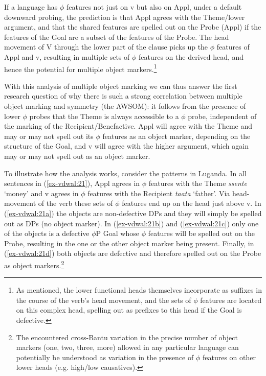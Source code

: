 \documentclass[output=paper
,modfonts
,nonflat]{langsci/langscibook}
\begin{document}
\noindent If a language has $\phi$ features not just on v but also on Appl, under a default downward probing, the prediction is that Appl agrees with the Theme/lower argument, and that the shared features are spelled out on the Probe (Appl) if the features of the Goal are a subset of the features of the Probe. The head movement of V through the lower part of the clause picks up the $\phi$ features of Appl and v, resulting in multiple sets of $\phi$ features on the derived head, and hence the potential for multiple object markers.\footnote{As mentioned, the lower functional heads themselves incorporate as suffixes in the course of the verb’s head movement, and the sets of $\phi$ features are located on this complex head, spelling out as prefixes to this head if the Goal is defective.}\largerpage[2]

With this analysis of multiple object marking we can thus answer the first research question of why there is such a strong correlation between multiple object marking and symmetry (the AWSOM): it follows from the presence of lower $\phi$ probes that the Theme is always accessible to a $\phi$ probe, independent of the marking of the Recipient/Benefactive. Appl will agree with the Theme and may or may not spell out its $\phi$ features as an object marker, depending on the structure of the Goal, and v will agree with the higher argument, which again may or may not spell out as an object marker. 

To illustrate how the analysis works, consider the patterns in Luganda. In all sentences in (\ref{ex-vdwal:21}), Appl agrees in $\phi $ features with the Theme \textit{ssente} ‘money’ and v agrees in $\phi$ features with the Recipient \textit{taata} ‘father’. Via head-movement of the verb these sets of $\phi$ features end up on the head just above v. In (\ref{ex-vdwal:21a}) the objects are non-defective DPs and they will simply be spelled out as DPs (no object marker). In (\ref{ex-vdwal:21b}) and (\ref{ex-vdwal:21c}) only one of the objects is a defective $\phi$P Goal whose $\phi$ features will be spelled out on the Probe, resulting in the one or the other object marker being present. Finally, in (\ref{ex-vdwal:21d}) both objects are defective and therefore spelled out on the Probe as object markers.\footnote{The encountered cross-Bantu variation in the precise number of object markers (one, two, three, more) allowed in any particular language \citep{Polak1986, Marlo2015} can potentially be understood as variation in the presence of $\phi$ features on other lower heads (e.g. high/low causatives).}
\end{document}
